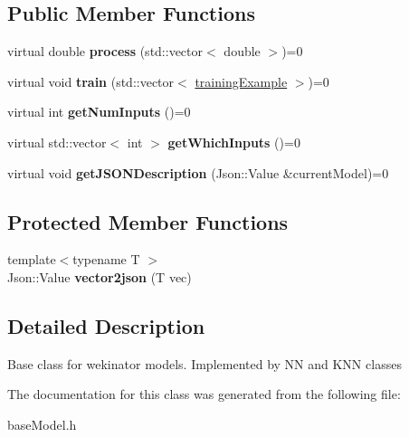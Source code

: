 \subsection*{Public Member Functions}
\begin{DoxyCompactItemize}
\item 
\mbox{\label{classbase_model_a07d92b944728ff2b3339d6bceaecb6a3}} 
virtual double {\bfseries process} (std\+::vector$<$ double $>$)=0
\item 
\mbox{\label{classbase_model_aed9192d6c0f17a1816a55b077baf2523}} 
virtual void {\bfseries train} (std\+::vector$<$ \hyperlink{structtraining_example}{training\+Example} $>$)=0
\item 
\mbox{\label{classbase_model_a1601088280ebe5be525fd1fe49d4b1e1}} 
virtual int {\bfseries get\+Num\+Inputs} ()=0
\item 
\mbox{\label{classbase_model_a5d6b7579536f5713eed0b7b4a6687a16}} 
virtual std\+::vector$<$ int $>$ {\bfseries get\+Which\+Inputs} ()=0
\item 
\mbox{\label{classbase_model_a54c7ba2132721c2f990ea2fe2313f863}} 
virtual void {\bfseries get\+J\+S\+O\+N\+Description} (Json\+::\+Value \&current\+Model)=0
\end{DoxyCompactItemize}
\subsection*{Protected Member Functions}
\begin{DoxyCompactItemize}
\item 
\mbox{\label{classbase_model_a853d3a2d610c43fca37676ac1459e3b9}} 
{\footnotesize template$<$typename T $>$ }\\Json\+::\+Value {\bfseries vector2json} (T vec)
\end{DoxyCompactItemize}


\subsection{Detailed Description}
Base class for wekinator models. Implemented by NN and K\+NN classes 

The documentation for this class was generated from the following file\+:\begin{DoxyCompactItemize}
\item 
base\+Model.\+h\end{DoxyCompactItemize}
